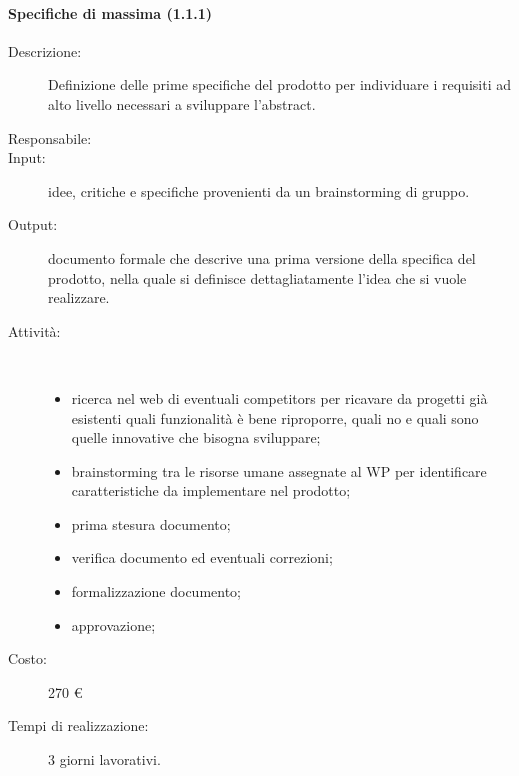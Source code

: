 \paragraph{Specifiche di massima (1.1.1)}
\begin{description}
\item[Descrizione:] Definizione delle prime specifiche del prodotto per individuare i requisiti ad alto livello necessari a sviluppare l'abstract.
\item[Responsabile:]
\item[Input:] idee, critiche e specifiche provenienti da un brainstorming di gruppo.
\item[Output:] documento formale che descrive una prima versione della specifica del prodotto, nella quale si definisce dettagliatamente l'idea che si vuole realizzare.
\item[Attività:]\mbox{}\\[-1.5\baselineskip]
	\begin{itemize}
	\item ricerca nel web di eventuali competitors per ricavare da progetti gi\`{a} esistenti quali funzionalit\`{a} \`{e} bene riproporre, quali no e quali sono quelle innovative che bisogna sviluppare;
	\item brainstorming tra le risorse umane assegnate al WP per identificare caratteristiche da implementare nel prodotto;
	\item prima stesura documento;
	\item verifica documento ed eventuali correzioni;
	\item formalizzazione documento;
	\item approvazione;
	\end{itemize}
\item[Costo:] 270 \euro{}
\item[Tempi di realizzazione:] 3 giorni lavorativi.
\end{description}

